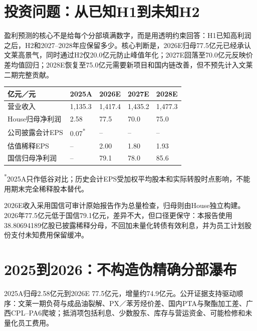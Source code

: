 \section{投资问题：从已知H1到未知H2}

盈利预测的核心不是给每个分部填满数字，而是用透明约束回答：H1已知高利润之后，H2和2027--2028年应保留多少。核心判断是，2026E归母77.5亿元已经承认文莱高景气，同时通过H2仅20.0亿元防止峰值年化；2027E回落至70.0亿元反映价差均值回归；2028E恢复至75.0亿元需要新项目和国内链改善，但不预先计入文莱二期完整贡献。

\begin{exhibitbox}[House盈利预测]
\noindent\begin{tabularx}{\textwidth}{L{3.4cm}R{2.0cm}R{2.0cm}R{2.0cm}R{2.0cm}}
\toprule
\textbf{亿元／元} & \textbf{2025A} & \textbf{2026E} & \textbf{2027E} & \textbf{2028E} \\
\midrule
营业收入 & 1,135.3 & 1,417.4 & 1,435.2 & 1,477.3 \\
House归母净利润 & 2.58 & 77.5 & 70.0 & 75.0 \\
公司披露会计EPS & 0.07\textsuperscript{*} & -- & -- & -- \\
估值稀释EPS & -- & 2.00 & 1.80 & 1.93 \\
国信归母净利润 & -- & 79.1 & 78.0 & 85.6 \\
\bottomrule
\end{tabularx}
\vspace{0.3em}
{\scriptsize \textsuperscript{*}2025A只作低谷对比；历史会计EPS受加权平均股本和实际转股时点影响，不能用期末完全稀释股本替代。}
\end{exhibitbox}

2026E收入采用国信可审计原始报告作为总量检查，归母则由House独立构建。2026年77.5亿元低于国信79.1亿元，差异不大，但口径更保守：本报告使用38.80694189亿股已披露稀释分母，不回加未量化转债有效利息，并为员工计划股份支付未知费用保留缓冲。

\section{2025到2026：不构造伪精确分部瀑布}

2025A归母2.58亿元到2026E 77.5亿元，增量约74.9亿元。公开证据支持驱动顺序：文莱一期负荷与成品油裂解、PX／苯芳烃价差、国内PTA与聚酯加工差、广西CPL--PA6爬坡；抵消项包括利息、少数股东、库存与营运资金、可能检修和未量化员工费用。

